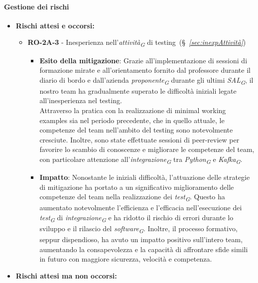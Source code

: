 \paragraph{Gestione dei rischi}

\begin{itemize}
    \item \textbf{Rischi attesi e occorsi:}
    \begin{itemize}
        \item \textbf{RO-2A-3} - Inesperienza nell'\textit{attività}\textsubscript{\textit{G}} di testing~(\S~\textit{\ref{sec:inexpAttività}})
        \begin{itemize}
            \item \textbf{Esito della mitigazione}: Grazie all'implementazione di sessioni di formazione mirate e all'orientamento fornito dal professore durante il diario di bordo e dall'azienda \textit{proponente}\textsubscript{\textit{G}} durante gli ultimi \textit{SAL}\textsubscript{\textit{G}}, il nostro team ha gradualmente superato le difficoltà iniziali legate all'inesperienza nel testing. \\
            Attraverso la pratica con la realizzazione di minimal working examples sia nel periodo precedente, che in quello attuale, le competenze del team nell'ambito del testing sono notevolmente cresciute. Inoltre, sono state effettuate sessioni di peer-review per favorire lo scambio di conoscenze e migliorare le competenze del team, con particolare attenzione all'\textit{integrazione}\textsubscript{\textit{G}} tra \textit{Python}\textsubscript{\textit{G}} e \textit{Kafka}\textsubscript{\textit{G}}.
            \item \textbf{Impatto}: Nonostante le iniziali difficoltà, l'attuazione delle strategie di mitigazione ha portato a un significativo miglioramento delle competenze del team nella realizzazione dei \textit{test}\textsubscript{\textit{G}}. Questo ha aumentato notevolmente l'efficienza e l'efficacia nell'esecuzione dei \textit{test}\textsubscript{\textit{G}} di \textit{integrazione}\textsubscript{\textit{G}} e ha ridotto il rischio di errori durante lo sviluppo e il rilascio del \textit{software}\textsubscript{\textit{G}}. Inoltre, il processo formativo, seppur dispendioso, ha avuto un impatto positivo sull'intero team, aumentando la consapevolezza e la capacità di affrontare sfide simili in futuro con maggiore sicurezza, velocità e competenza.
        \end{itemize}
    \end{itemize}
\item \textbf{Rischi attesi ma non occorsi:}

\end{itemize}
